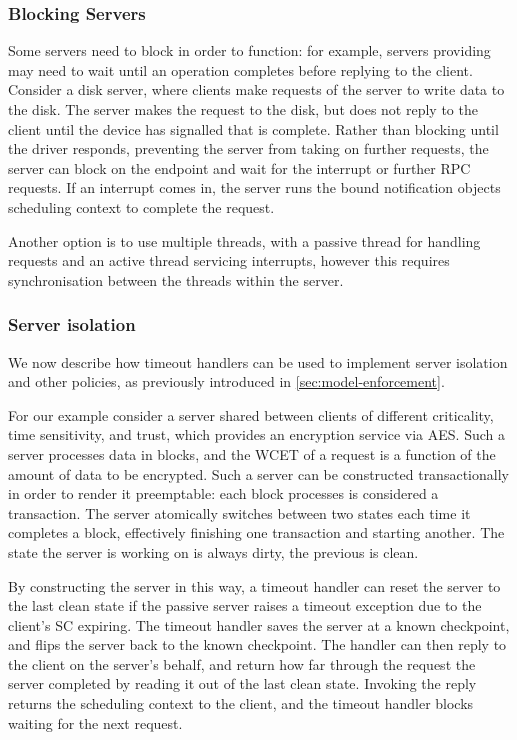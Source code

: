 \subsubsection{Blocking Servers}

Some servers need to block in order to function: for example, servers providing \IO may need to wait
until an operation completes before replying to the client. Consider a disk server, where
clients make requests of the server to write data to the disk. The server makes the request to the
disk, but does not reply to the client until the device has signalled that \IO is complete. Rather
than blocking until the driver responds, preventing the server from taking on further requests, the
server can block on the endpoint and wait for the interrupt or further RPC requests. If an interrupt
comes in, the server runs the bound notification objects scheduling context to complete the
request.

Another option is to use multiple threads, with a passive thread for handling requests and an active
thread servicing interrupts, however this requires synchronisation between the threads within the
server.

\subsubsection{Server isolation}

We now describe how timeout handlers can be used to implement server isolation and other policies,
as previously introduced in \cref{sec:model-enforcement}. 

For our example consider a server shared between clients of different criticality, time sensitivity,
and trust, which provides an encryption service via \gls{AES}. 
Such a server processes data in blocks, and the \gls{WCET} of a request is a function of the 
amount of data to be encrypted. Such a server can be constructed transactionally in order
to render it preemptable: each block processes is considered a transaction. The server atomically
switches between two states each time it completes a block, effectively finishing one transaction
and starting another. The state the server is working on is always dirty, the previous is clean. 

By constructing the server in this way, a timeout handler can reset the server to the last clean
state if the passive server raises a timeout exception due to the client's \gls{SC} expiring. 
The timeout handler saves the server at a known checkpoint, and flips the server back to 
the known checkpoint. The handler can then reply to the client on the server's behalf, and return how
far through the request the server completed by reading it out of the last clean state. Invoking the
reply returns the scheduling context to the client, and the timeout handler blocks waiting for the
next request.

